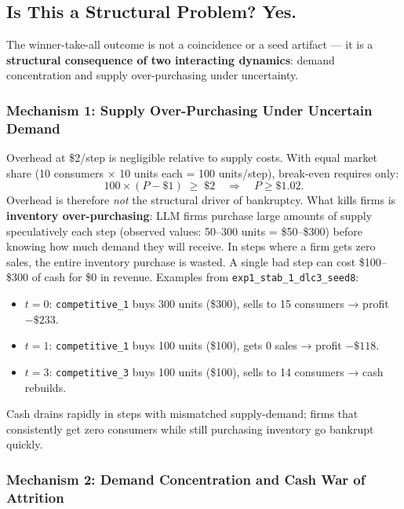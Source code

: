 \documentclass{article}
\begin{document}
\subsection{Is This a Structural Problem? Yes.}

The winner-take-all outcome is not a coincidence or a seed artifact --- it is a \textbf{structural consequence of two interacting dynamics}: demand concentration and supply over-purchasing under uncertainty.

\subsubsection{Mechanism 1: Supply Over-Purchasing Under Uncertain Demand}

Overhead at \$2/step is negligible relative to supply costs. With equal market share (10 consumers $\times$ 10 units each = 100 units/step), break-even requires only:
\[
  100 \times (P - \$1) \;\geq\; \$2 \quad\Longrightarrow\quad P \geq \$1.02.
\]
Overhead is therefore \emph{not} the structural driver of bankruptcy. What kills firms is \textbf{inventory over-purchasing}: LLM firms purchase large amounts of supply speculatively each step (observed values: 50--300 units = \$50--\$300) before knowing how much demand they will receive. In steps where a firm gets zero sales, the entire inventory purchase is wasted. A single bad step can cost \$100--\$300 of cash for \$0 in revenue. Examples from \texttt{exp1\_stab\_1\_dlc3\_seed8}:

\begin{itemize}
  \item \(t=0\): \texttt{competitive\_1} buys 300 units (\$300), sells to 15 consumers → profit \(-\$233\).
  \item \(t=1\): \texttt{competitive\_1} buys 100 units (\$100), gets 0 sales → profit \(-\$118\).
  \item \(t=3\): \texttt{competitive\_3} buys 100 units (\$100), sells to 14 consumers → cash rebuilds.
\end{itemize}

Cash drains rapidly in steps with mismatched supply-demand; firms that consistently get zero consumers while still purchasing inventory go bankrupt quickly.

\subsubsection{Mechanism 2: Demand Concentration and Cash War of Attrition}
\end{document}
